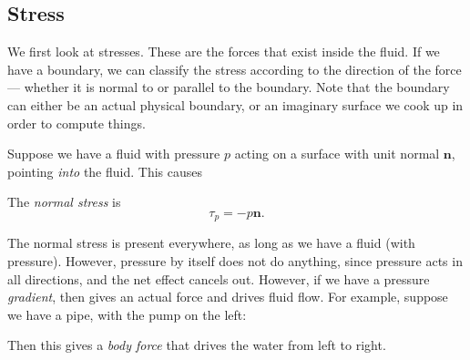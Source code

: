 \documentclass[a4paper]{article}
\begin{document}
\subsection{Stress}
We first look at stresses. These are the forces that exist inside the fluid. If we have a boundary, we can classify the stress according to the direction of the force --- whether it is normal to or parallel to the boundary. Note that the boundary can either be an actual physical boundary, or an imaginary surface we cook up in order to compute things.

Suppose we have a fluid with pressure $p$ acting on a surface with unit normal $\mathbf{n}$, pointing \emph{into} the fluid. This causes
\begin{center}
\end{center}

\begin{defi}
  The \emph{normal stress} is
  \[
    \tau_p = -p\mathbf{n}.
  \]
\end{defi}
The normal stress is present everywhere, as long as we have a fluid (with pressure). However, pressure by itself does not do anything, since pressure acts in all directions, and the net effect cancels out. However, if we have a pressure \emph{gradient}, then gives an actual force and drives fluid flow. For example, suppose we have a pipe, with the pump on the left:
\begin{center}
\end{center}
Then this gives a \emph{body force} that drives the water from left to right.
\end{document}
